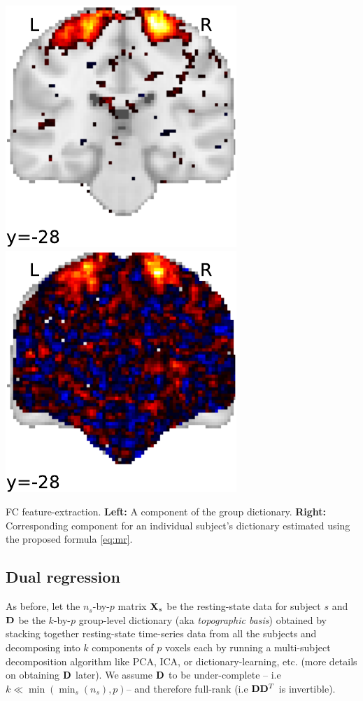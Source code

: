\begin{marginfigure}%
  \includegraphics[width=.47\linewidth]{figures/global_dict.pdf}  
  \includegraphics[width=.47\linewidth]{figures/subject_dict.pdf}
  \caption{FC feature-extraction. \textbf{Left:} A component of the
    group dictionary.  \textbf{Right:} Corresponding component for
    an individual subject's dictionary estimated using the proposed formula
    \eqref{eq:mr}.}
  \label{fig:fe}
\end{marginfigure}

\subsection{Dual regression}
As before, let the $n_s$-by-$p$ matrix $\mathbf{X}_s$ be the resting-state data for subject $s$ and
$\mathbf{D}$ be the $k$-by-$p$ group-level dictionary (aka \textit{topographic basis}) obtained by
stacking together resting-state
time-series data from all the subjects and decomposing into $k$ components of $p$ voxels each by
running a multi-subject decomposition algorithm like PCA, ICA, or dictionary-learning, etc.
(more details on obtaining $\mathbf{D}$ later).
%
We assume $\mathbf{D}$ to be under-complete -- i.e $k \ll \min(\min_s(n_s), p)$--
and therefore full-rank (i.e $\mathbf{D}\mathbf{D}^T$ is invertible).

